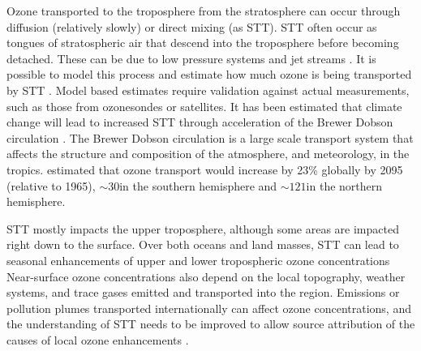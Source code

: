     
    Ozone transported to the troposphere from the stratosphere can occur through diffusion (relatively slowly) or direct mixing (as STT).
    STT often occur as tongues of stratospheric air that descend into the troposphere before becoming detached.
    These can be due to low pressure systems and jet streams \parencite{Sprenger2003}.
    It is possible to model this process and estimate how much ozone is being transported by STT \parencite[e.g.][]{Young2013,Ojha2016}.
    Model based estimates require validation against actual measurements, such as those from ozonesondes or satellites.
    It has been estimated that climate change will lead to increased STT through acceleration of the Brewer Dobson circulation \parencite{Hegglin2009}.
    The Brewer Dobson circulation is a large scale transport system that affects the structure and composition of the atmosphere, and meteorology, in the tropics.
    \textcite{Hegglin2009} estimated that ozone transport would increase by 23\% globally by 2095 (relative to 1965), $\sim 30$\tgpyr in the southern hemisphere and $\sim 121$\tgpyr in the northern hemisphere.
    
    STT mostly impacts the upper troposphere, although some areas are impacted right down to the surface.
    Over both oceans and land masses, STT can lead to seasonal enhancements of upper and lower tropospheric ozone concentrations \parencite{Lin2015,Liu2017,Kuang2017}
    Near-surface ozone concentrations also depend on the local topography, weather systems, and trace gases emitted and transported into the region.
    Emissions or pollution plumes transported internationally can affect ozone concentrations, and the understanding of STT needs to be improved to allow source attribution of the causes of local ozone enhancements \parencite{Lin2015}.
    

